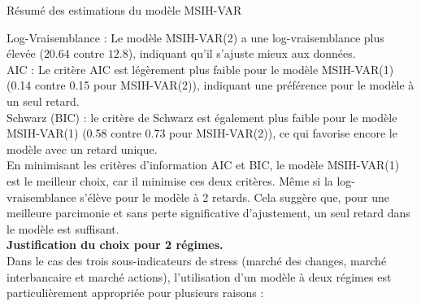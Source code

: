 \begin{table}[H]
    \centering
    \caption{Résumé des estimations du modèle MSIH-VAR}
    \sffamily
    
    \label{tab:comparaison2}
\end{table}

Log-Vraisemblance : Le modèle MSIH-VAR(2) a une log-vraisemblance plus élevée ($20.64$ contre $12.8$), indiquant qu'il s'ajuste mieux aux données.\\

AIC : Le critère AIC est légèrement plus faible pour le modèle MSIH-VAR(1) (0.14 contre 0.15 pour MSIH-VAR(2)), indiquant une préférence pour le modèle à un seul retard.\\

Schwarz (BIC) : le critère de Schwarz est également plus faible pour le modèle MSIH-VAR(1) (0.58 contre 0.73 pour MSIH-VAR(2)), ce qui favorise encore le modèle avec un retard unique.\\

En minimisant les critères d'information AIC et BIC, le modèle MSIH-VAR(1) est le meilleur choix, car il minimise ces deux critères. Même si la log-vraisemblance s'élève pour le modèle à 2 retards. Cela suggère que, pour une meilleure parcimonie et sans perte significative d'ajustement, un seul retard dans le modèle est suffisant.\\

\textbf{Justification du choix pour 2 régimes.}\\

Dans le cas des trois sous-indicateurs de stress (marché des changes, marché interbancaire et marché actions), l'utilisation d'un modèle à deux régimes est particulièrement appropriée pour plusieurs raisons : 

